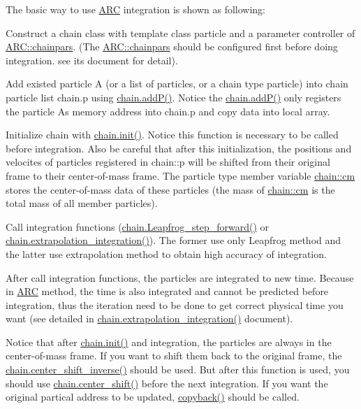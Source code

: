 The basic way to use \hyperlink{namespaceARC}{A\+RC} integration is shown as following\+:
\begin{DoxyEnumerate}
\item Construct a chain class with template class particle and a parameter controller of \hyperlink{classARC_1_1chainpars}{A\+R\+C\+::chainpars}. (The \hyperlink{classARC_1_1chainpars}{A\+R\+C\+::chainpars} should be configured first before doing integration. see its document for detail).
\item Add existed particle \textquotesingle{}A\textquotesingle{} (or a list of particles, or a chain type particle) into chain particle list chain.\+p using \hyperlink{classARC_1_1chain_a0f91c399beb1e5c0db6ed7e2b4d00477}{chain.\+add\+P()}. Notice the \hyperlink{classARC_1_1chain_a0f91c399beb1e5c0db6ed7e2b4d00477}{chain.\+add\+P()} only registers the particle A\textquotesingle{}s memory address into chain.\+p and copy data into local array.
\item Initialize chain with \hyperlink{classARC_1_1chain_a269690a2daece1dacb21a78e11b019a6}{chain.\+init()}. Notice this function is necessary to be called before integration. Also be careful that after this initialization, the positions and velocites of particles registered in chain\+::p will be shifted from their original frame to their center-\/of-\/mass frame. The particle type member variable \hyperlink{classARC_1_1chain_ae9f6a5cbf7aac2b33c7274e7e10916ed}{chain\+::cm} stores the center-\/of-\/mass data of these particles (the mass of \hyperlink{classARC_1_1chain_ae9f6a5cbf7aac2b33c7274e7e10916ed}{chain\+::cm} is the total mass of all member particles).
\item Call integration functions (\hyperlink{classARC_1_1chain_a80fd78294335c1990783ec562213342b}{chain.\+Leapfrog\+\_\+step\+\_\+forward()} or \hyperlink{classARC_1_1chain_adedfb41cd82c64ca09dbc55a76b145fc}{chain.\+extrapolation\+\_\+integration()}). The former use only Leapfrog method and the latter use extrapolation method to obtain high accuracy of integration.
\item After call integration functions, the particles are integrated to new time. Because in \hyperlink{namespaceARC}{A\+RC} method, the time is also integrated and cannot be predicted before integration, thus the iteration need to be done to get correct physical time you want (see detailed in \hyperlink{classARC_1_1chain_adedfb41cd82c64ca09dbc55a76b145fc}{chain.\+extrapolation\+\_\+integration()} document).
\item Notice that after \hyperlink{classARC_1_1chain_a269690a2daece1dacb21a78e11b019a6}{chain.\+init()} and integration, the particles are always in the center-\/of-\/mass frame. If you want to shift them back to the original frame, the \hyperlink{classARC_1_1chain_a52edc1843550578f5be5590b7403ef97}{chain.\+center\+\_\+shift\+\_\+inverse()} should be used. But after this function is used, you should use \hyperlink{classARC_1_1chain_a68ae268afb418455bfdd6e8101b3b4eb}{chain.\+center\+\_\+shift()} before the next integration. If you want the original partical address to be updated, \hyperlink{classARC_1_1chain_a780fe41b768a5f8821ea799dae8b3d10}{copyback()} should be called.
\end{DoxyEnumerate}


